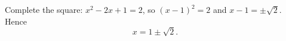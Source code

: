 Complete the square: $x^2-2x+1=2$, so $(x-1)^2=2$ and $x-1=\pm\sqrt2$. Hence
\[
x=\boxed{1\pm\sqrt2}.
\]
